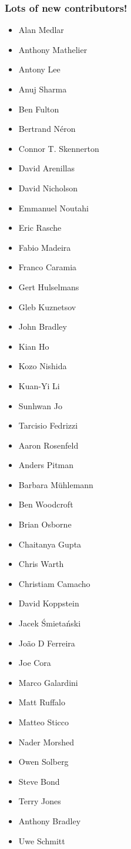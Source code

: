 \documentclass[trans]{beamer}
\begin{document}
\frame
{
  \frametitle{Lots of new contributors!}
  
  \scriptsize{
  \begin{multicols}{3}
  \begin{itemize}
  \item Alan Medlar
  \item Anthony Mathelier
  \item Antony Lee
  \item Anuj Sharma
  \item Ben Fulton
  \item Bertrand Néron
  \item Connor T. Skennerton
  \item David Arenillas
  \item David Nicholson
  \item Emmanuel Noutahi
  \item Eric Rasche
  \item Fabio Madeira
  \item Franco Caramia
  \item Gert Hulselmans
  \item Gleb Kuznetsov
  \item John Bradley
  \item Kian Ho
  \item Kozo Nishida
  \item Kuan-Yi Li
  \item Sunhwan Jo
  \item Tarcisio Fedrizzi

  \item Aaron Rosenfeld
  \item Anders Pitman
  \item Barbara Mühlemann
  \item Ben Woodcroft
  \item Brian Osborne
  \item Chaitanya Gupta
  \item Chris Warth
  \item Christiam Camacho
  \item David Koppstein
  \item Jacek Śmietański
  \item João D Ferreira
  \item Joe Cora
  \item Marco Galardini
  \item Matt Ruffalo
  \item Matteo Sticco
  \item Nader Morshed
  \item Owen Solberg
  \item Steve Bond
  \item Terry Jones

  \item Anthony Bradley
  \item Uwe Schmitt
  \end{itemize}
  \end{multicols}
  }
}
\end{document}
